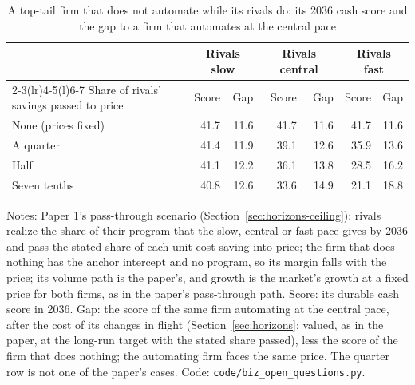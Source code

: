 \begin{table}[!ht]\centering\footnotesize\setlength{\tabcolsep}{4pt}
\caption{A top-tail firm that does not automate while its rivals do: its 2036 cash score and the gap to a firm that automates at the central pace}\label{tab:ext-nothing}
\begin{tabular}{@{}lrrrrrr@{}}\toprule
& \multicolumn{2}{c}{Rivals slow} & \multicolumn{2}{c}{Rivals central} & \multicolumn{2}{c}{Rivals fast}\\\cmidrule(lr){2-3}\cmidrule(lr){4-5}\cmidrule(l){6-7}
Share of rivals' savings passed to price & Score & Gap & Score & Gap & Score & Gap\\\midrule
None (prices fixed) & 41.7 & 11.6 & 41.7 & 11.6 & 41.7 & 11.6\\
A quarter & 41.4 & 11.9 & 39.1 & 12.6 & 35.9 & 13.6\\
Half & 41.1 & 12.2 & 36.1 & 13.8 & 28.5 & 16.2\\
Seven tenths & 40.8 & 12.6 & 33.6 & 14.9 & 21.1 & 18.8\\
\bottomrule\end{tabular}
\par\vspace{2pt}\footnotesize\raggedright Notes: Paper 1's pass-through scenario (Section~\ref{sec:horizons-ceiling}): rivals realize the share of their program that the slow, central or fast pace gives by 2036 and pass the stated share of each unit-cost saving into price; the firm that does nothing has the anchor intercept and no program, so its margin falls with the price; its volume path is the paper's, and growth is the market's growth at a fixed price for both firms, as in the paper's pass-through path. Score: its durable cash score in 2036. Gap: the score of the same firm automating at the central pace, after the cost of its changes in flight (Section~\ref{sec:horizons}; valued, as in the paper, at the long-run target with the stated share passed), less the score of the firm that does nothing; the automating firm faces the same price. The quarter row is not one of the paper's cases. Code: \texttt{code/biz\_open\_questions.py}.
\end{table}
